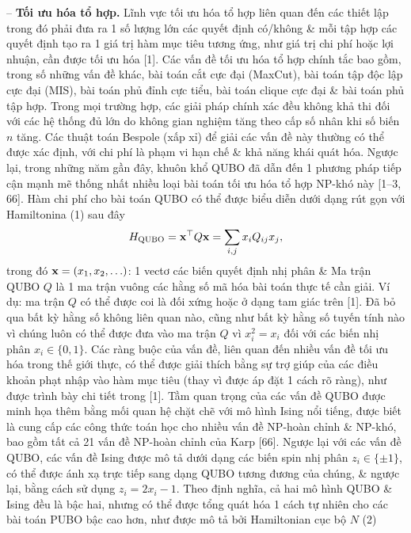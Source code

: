 \documentclass{article}
\begin{document}
\begin{itemize}
    -- {\bf Tối ưu hóa tổ hợp.} Lĩnh vực tối ưu hóa tổ hợp liên quan đến các thiết lập trong đó phải đưa ra 1 số lượng lớn các quyết định có/không \& mỗi tập hợp các quyết định tạo ra 1 giá trị hàm mục tiêu tương ứng, như giá trị chi phí hoặc lợi nhuận, cần được tối ưu hóa [1]. Các vấn đề tối ưu hóa tổ hợp chính tắc bao gồm, trong số những vấn đề khác, bài toán cắt cực đại (MaxCut), bài toán tập độc lập cực đại (MIS), bài toán phủ đỉnh cực tiểu, bài toán clique cực đại \& bài toán phủ tập hợp. Trong mọi trường hợp, các giải pháp chính xác đều không khả thi đối với các hệ thống đủ lớn do không gian nghiệm tăng theo cấp số nhân khi số biến $n$ tăng. Các thuật toán Bespole (xấp xỉ) để giải các vấn đề này thường có thể được xác định, với chi phí là phạm vi hạn chế \& khả năng khái quát hóa. Ngược lại, trong những năm gần đây, khuôn khổ QUBO đã dẫn đến 1 phương pháp tiếp cận mạnh mẽ thống nhất nhiều loại bài toán tối ưu hóa tổ hợp NP-khó này [1--3, 66]. Hàm chi phí cho bài toán QUBO có thể được biểu diễn dưới dạng rút gọn với Hamiltonina (1) sau đây
    \begin{equation*}
        H_{\rm QUBO} = {\bf x}^\top Q{\bf x} = \sum_{i,j} x_iQ_{ij}x_j,
    \end{equation*}
    trong đó ${\bf x} = (x_1,x_2,\ldots)$: 1 vectơ các biến quyết định nhị phân \& Ma trận QUBO $Q$ là 1 ma trận vuông các hằng số mã hóa bài toán thực tế cần giải. Ví dụ: ma trận $Q$ có thể được coi là đối xứng hoặc ở dạng tam giác trên [1]. Đã bỏ qua bất kỳ hằng số không liên quan nào, cũng như bất kỳ hằng số tuyến tính nào vì chúng luôn có thể được đưa vào ma trận $Q$ vì $x_i^2 = x_i$ đối với các biến nhị phân $x_i\in\{0,1\}$. Các ràng buộc của vấn đề, liên quan đến nhiều vấn đề tối ưu hóa trong thế giới thực, có thể được giải thích bằng sự trợ giúp của các điều khoản phạt nhập vào hàm mục tiêu (thay vì được áp đặt 1 cách rõ ràng), như được trình bày chi tiết trong [1]. Tầm quan trọng của các vấn đề QUBO được minh họa thêm bằng mối quan hệ chặt chẽ với mô hình Ising nổi tiếng, được biết là cung cấp các công thức toán học cho nhiều vấn đề NP-hoàn chỉnh \& NP-khó, bao gồm tất cả 21 vấn đề NP-hoàn chỉnh của Karp [66]. Ngược lại với các vấn đề QUBO, các vấn đề Ising được mô tả dưới dạng các biến spin nhị phân $z_i\in\{\pm1\}$, có thể được ánh xạ trực tiếp sang dạng QUBO tương đương của chúng, \& ngược lại, bằng cách sử dụng $z_i = 2x_i - 1$. Theo định nghĩa, cả hai mô hình QUBO \& Ising đều là bậc hai, nhưng có thể được tổng quát hóa 1 cách tự nhiên cho các bài toán PUBO bậc cao hơn, như được mô tả bởi Hamiltonian cục bộ $N$ (2)

\end{itemize}
\end{document}
